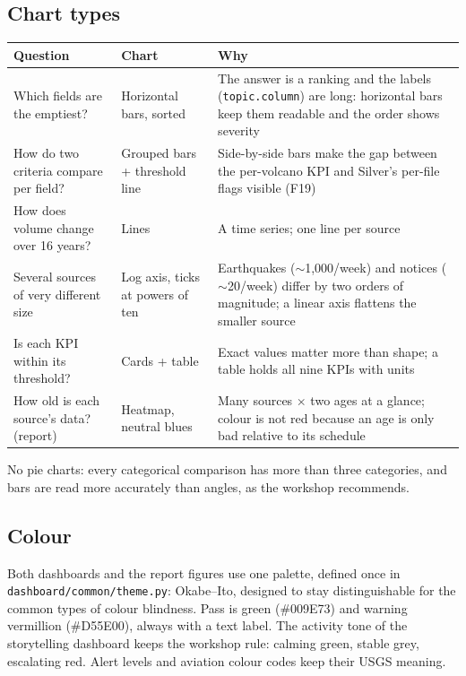 \documentclass[11pt,a4paper]{article}
\renewcommand{\_}{\textunderscore\allowbreak}
\begin{document}
\subsection{Chart types}
\begin{longtable}{L{3.6cm}L{3.0cm}L{7.6cm}}
\toprule
\textbf{Question} & \textbf{Chart} & \textbf{Why}\\
\midrule\endhead
Which fields are the emptiest? & Horizontal bars, sorted & The answer is a ranking and the labels (\texttt{topic.column}) are long: horizontal bars keep them readable and the order shows severity\\
How do two criteria compare per field? & Grouped bars + threshold line & Side-by-side bars make the gap between the per-volcano KPI and Silver's per-file flags visible (F19)\\
How does volume change over 16 years? & Lines & A time series; one line per source\\
Several sources of very different size & Log axis, ticks at powers of ten & Earthquakes ($\sim$1,000/week) and notices ($\sim$20/week) differ by two orders of magnitude; a linear axis flattens the smaller source\\
Is each KPI within its threshold? & Cards + table & Exact values matter more than shape; a table holds all nine KPIs with units\\
How old is each source's data? (report) & Heatmap, neutral blues & Many sources $\times$ two ages at a glance; colour is not red because an age is only bad relative to its schedule\\
\bottomrule
\end{longtable}
\noindent No pie charts: every categorical comparison has more than three categories, and bars are read
more accurately than angles, as the workshop recommends.

\subsection{Colour}
Both dashboards and the report figures use one palette, defined once in
\texttt{dashboard/\allowbreak common/\allowbreak theme.py}: Okabe--Ito, designed to stay distinguishable for the common types of
colour blindness. Pass is green (\#009E73) and warning vermillion (\#D55E00), always with a text label.
The activity tone of the storytelling dashboard keeps the workshop rule: calming green, stable grey,
escalating red. Alert levels and aviation colour codes keep their USGS meaning.
\end{document}
